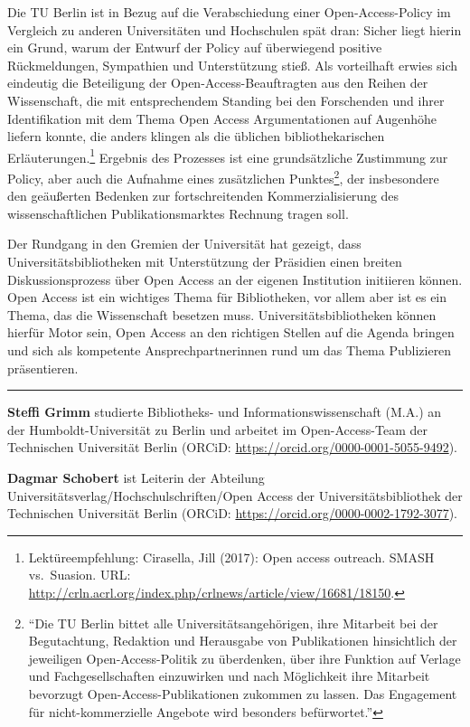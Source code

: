 \documentclass[a4paper,
fontsize=11pt,
oneside,
numbers=noperiodatend,
parskip=half-,
bibliography=totoc,
final
]{scrartcl}
\begin{document}
Die TU Berlin ist in Bezug auf die Verabschiedung einer
Open-Access-Policy im Vergleich zu anderen Universitäten und Hochschulen
spät dran: Sicher liegt hierin ein Grund, warum der Entwurf der Policy
auf überwiegend positive Rückmeldungen, Sympathien und Unterstützung
stieß. Als vorteilhaft erwies sich eindeutig die Beteiligung der
Open-Access-Beauftragten aus den Reihen der Wissenschaft, die mit
entsprechendem Standing bei den Forschenden und ihrer Identifikation mit
dem Thema Open Access Argumentationen auf Augenhöhe liefern konnte, die
anders klingen als die üblichen bibliothekarischen
Erläuterungen.\footnote{Lektüreempfehlung: Cirasella, Jill (2017): Open
  access outreach. SMASH vs.~Suasion. URL:
  \url{http://crln.acrl.org/index.php/crlnews/article/view/16681/18150}.}
Ergebnis des Prozesses ist eine grundsätzliche Zustimmung zur Policy,
aber auch die Aufnahme eines zusätzlichen Punktes\footnote{\enquote{Die
  TU Berlin bittet alle Universitätsangehörigen, ihre Mitarbeit bei der
  Begutachtung, Redaktion und Herausgabe von Publikationen hinsichtlich
  der jeweiligen Open-Access-Politik zu überdenken, über ihre Funktion
  auf Verlage und Fachgesellschaften einzuwirken und nach Möglichkeit
  ihre Mitarbeit bevorzugt Open-Access-Publikationen zukommen zu lassen.
  Das Engagement für nicht-kommerzielle Angebote wird besonders
  befürwortet.}}, der insbesondere den geäußerten Bedenken zur
fortschreitenden Kommerzialisierung des wissenschaftlichen
Publikationsmarktes Rechnung tragen soll.

Der Rundgang in den Gremien der Universität hat gezeigt, dass
Universitätsbibliotheken mit Unterstützung der Präsidien einen breiten
Diskussionsprozess über Open Access an der eigenen Institution
initiieren können. Open Access ist ein wichtiges Thema für Bibliotheken,
vor allem aber ist es ein Thema, das die Wissenschaft besetzen muss.
Universitätsbibliotheken können hierfür Motor sein, Open Access an den
richtigen Stellen auf die Agenda bringen und sich als kompetente
Ansprechpartnerinnen rund um das Thema Publizieren präsentieren.

\begin{center}\rule{0.5\linewidth}{\linethickness}\end{center}

\textbf{Steffi Grimm} studierte Bibliotheks- und
Informationswissenschaft (M.A.) an der Humboldt-Universität zu Berlin
und arbeitet im Open-Access-Team der Technischen Universität Berlin
(ORCiD: \url{https://orcid.org/0000-0001-5055-9492}).

\textbf{Dagmar Schobert} ist Leiterin der Abteilung
Universitätsverlag/Hochschulschriften/Open Access der
Universitätsbibliothek der Technischen Universität Berlin (ORCiD:
\url{https://orcid.org/0000-0002-1792-3077}).
\end{document}
